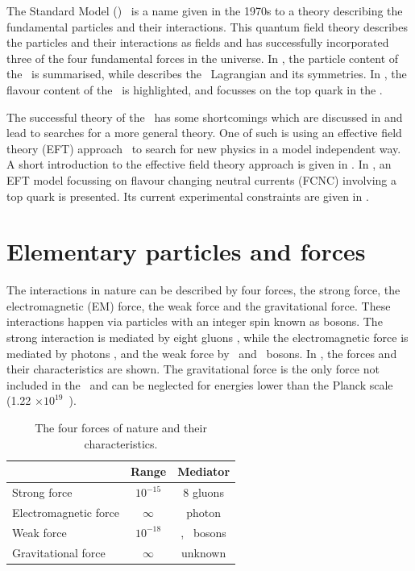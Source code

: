 The Standard Model (\SM)~\cite{Peskin:257493} 
is a name given in the 1970s to a theory describing the fundamental particles and their interactions. This quantum field theory describes the particles and their interactions as fields and has successfully incorporated three of the four fundamental forces in the universe. In , the particle content of the \SM\ is summarised, while  describes  the \SM\ Lagrangian and its symmetries. In , the flavour content of the \SM\ is highlighted, and  focusses on the top quark in the \SM.

The successful theory of the \SM\ has some shortcomings which are discussed in  and lead to searches for a more general theory. One of such  is using  an effective field theory (EFT) approach~\cite{Burgess:2007pt}  to search for new physics in a model independent way.  A short introduction to the effective field theory approach is given in . In , an EFT model focussing on flavour changing neutral currents (FCNC) involving a top quark is presented. Its current experimental constraints are given in .



\section{Elementary particles and forces}
\label{sec:SMcontent}
The interactions in nature can be described by four forces, the strong force, the electromagnetic (EM) force, the weak force and the gravitational force. These interactions happen via particles with an integer spin known as bosons. The strong interaction is mediated by eight gluons \Pgluon, while the electromagnetic force is mediated by photons \Pphoton, and the weak force by \PZ\ and \PWpm\ bosons. In , the forces and their characteristics are shown. The gravitational force is the only force not included in the \SM\ and can be neglected for energies lower than the Planck scale (1.22 $\times 10^{19}$~\GeV).
\begin{table}[htbp]
	\centering
	\caption{The four forces of nature and their characteristics.}
	\begin{tabular}{lcc}
		\toprule
		& Range & Mediator \\ 
		\midrule
		Strong force & $10^{-15}$ \m & 8 gluons  \\ 
	
		Electromagnetic force & $\infty$ & photon  \\ 
		 
		Weak force & $10^{-18}$ \m & \PWpm, \PZ\ bosons \\ 
		
		Gravitational force & $\infty$ & unknown \\ 
		\bottomrule
	\end{tabular} 
	\label{tab:forces}
\end{table}

